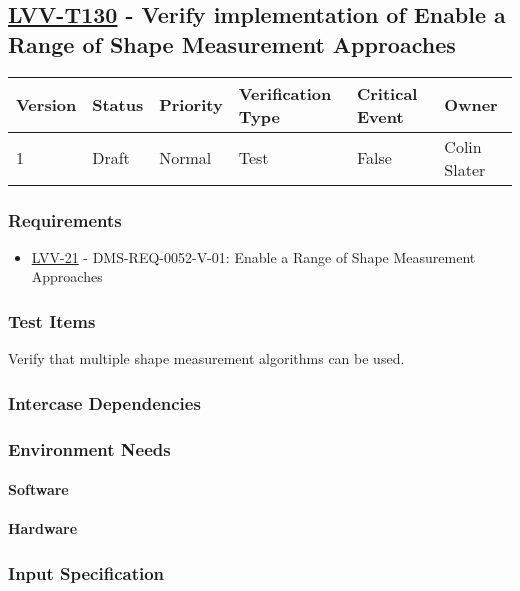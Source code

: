 \subsection{\href{https://jira.lsstcorp.org/secure/Tests.jspa\#/testCase/LVV-T130}{LVV-T130}
    - Verify implementation of Enable a Range of Shape Measurement Approaches}\label{lvv-t130}

\begin{longtable}[]{llllll}
\toprule
Version & Status & Priority & Verification Type & Critical Event & Owner
\\\midrule
1 & Draft & Normal &
Test & False & Colin Slater
\\\bottomrule
\end{longtable}

\subsubsection{Requirements}
\begin{itemize}
\item \href{https://jira.lsstcorp.org/browse/LVV-21}{LVV-21} - DMS-REQ-0052-V-01: Enable a Range of Shape Measurement Approaches
\end{itemize}

\subsubsection{Test Items}
Verify that multiple shape measurement algorithms can be used.



\subsubsection{Intercase Dependencies}

\subsubsection{Environment Needs}

\paragraph{Software}

\paragraph{Hardware}

\subsubsection{Input Specification}

